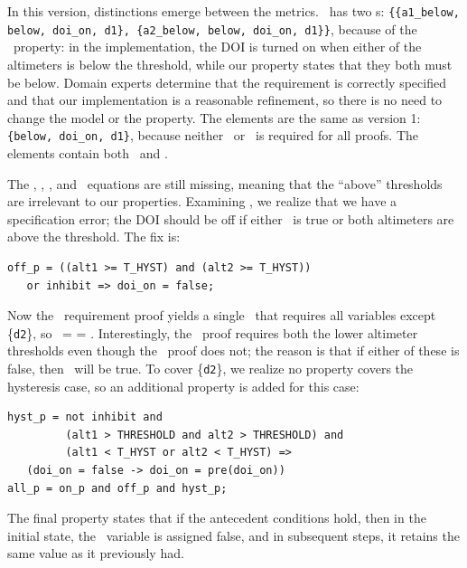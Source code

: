 \noindent In this version, distinctions emerge between the metrics.  \allp\ has two \mivc s: \texttt{\{\{a1\_below, below, doi\_on, d1\}, \{a2\_below, below, doi\_on, d1\}\}}, because of the \onp\ property: in the implementation, the DOI is turned on when either of the altimeters is below the threshold, while our property states that they both must be below.
Domain experts determine that the requirement is correctly specified and that our implementation is a reasonable refinement, so there is no need to change the model or the property.  The \must elements are the same as version 1: \texttt{\{below, doi\_on, d1\}}, because neither \aonebelow\ or \atwobelow\ is required for all proofs.  %
The \may elements contain both \aonebelow\ and \atwobelow.

The \abovehyst, \aoneabove, \atwoabove, and \dtwo\ equations are still missing, meaning that the ``above'' thresholds are irrelevant to our properties.  Examining \offp, we realize that we have a specification error; the DOI should be off if either \inhibit\ is true or both altimeters are above the threshold. The fix is:

{\smaller
\begin{verbatim}
off_p = ((alt1 >= T_HYST) and (alt2 >= T_HYST))
   or inhibit => doi_on = false;
\end{verbatim}
}

\noindent Now the \allp\ requirement proof yields a single \mivc ~that requires all variables except \{\texttt{d2}\}, so \mivc ~= \may = \must.  Interestingly, the \offp\ proof requires both the lower altimeter thresholds even though the \onp\ proof does not; the reason is that if either of these is false, then \doion\ will be true.  To cover \{\texttt{d2}\}, we realize no property covers the hysteresis case, so an additional property is added for this case:

{\smaller
\begin{verbatim}
hyst_p = not inhibit and
         (alt1 > THRESHOLD and alt2 > THRESHOLD) and
         (alt1 < T_HYST or alt2 < T_HYST) =>
   (doi_on = false -> doi_on = pre(doi_on))
all_p = on_p and off_p and hyst_p;
\end{verbatim}
}
\noindent The final property states that if the antecedent conditions hold, then in the initial state, the \doion\ variable is assigned false, and in subsequent steps, it retains the same value as it previously had.

